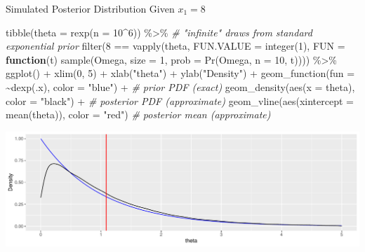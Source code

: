 \documentclass[
  ignorenonframetext,
]{beamer}
\newenvironment{Shaded}{\begin{snugshade}}{\end{snugshade}}
\newcommand{\AttributeTok}[1]{\textcolor[rgb]{0.77,0.63,0.00}{#1}}
\newcommand{\CommentTok}[1]{\textcolor[rgb]{0.56,0.35,0.01}{\textit{#1}}}
\newcommand{\ControlFlowTok}[1]{\textcolor[rgb]{0.13,0.29,0.53}{\textbf{#1}}}
\newcommand{\DecValTok}[1]{\textcolor[rgb]{0.00,0.00,0.81}{#1}}
\newcommand{\FunctionTok}[1]{\textcolor[rgb]{0.00,0.00,0.00}{#1}}
\newcommand{\NormalTok}[1]{#1}
\newcommand{\SpecialCharTok}[1]{\textcolor[rgb]{0.00,0.00,0.00}{#1}}
\newcommand{\StringTok}[1]{\textcolor[rgb]{0.31,0.60,0.02}{#1}}
\begin{document}
\begin{frame}[fragile]{Simulated Posterior Distribution Given
\(x_1 = 8\)}
\protect\hypertarget{simulated-posterior-distribution-given-x_1-8}{}
\begin{Shaded}
\begin{Highlighting}[]
\FunctionTok{tibble}\NormalTok{(}\AttributeTok{theta =} \FunctionTok{rexp}\NormalTok{(}\AttributeTok{n =} \DecValTok{10}\SpecialCharTok{\^{}}\DecValTok{6}\NormalTok{)) }\SpecialCharTok{\%\textgreater{}\%} \CommentTok{\# "infinite" draws from standard exponential prior}
  \FunctionTok{filter}\NormalTok{(}\DecValTok{8} \SpecialCharTok{==} \FunctionTok{vapply}\NormalTok{(theta, }\AttributeTok{FUN.VALUE =} \FunctionTok{integer}\NormalTok{(}\DecValTok{1}\NormalTok{), }\AttributeTok{FUN =} \ControlFlowTok{function}\NormalTok{(t) }
    \FunctionTok{sample}\NormalTok{(Omega, }\AttributeTok{size =} \DecValTok{1}\NormalTok{, }\AttributeTok{prob =} \FunctionTok{Pr}\NormalTok{(Omega, }\AttributeTok{n =} \DecValTok{10}\NormalTok{, t)))) }\SpecialCharTok{\%\textgreater{}\%}
  \FunctionTok{ggplot}\NormalTok{() }\SpecialCharTok{+} \FunctionTok{xlim}\NormalTok{(}\DecValTok{0}\NormalTok{, }\DecValTok{5}\NormalTok{) }\SpecialCharTok{+} \FunctionTok{xlab}\NormalTok{(}\StringTok{"theta"}\NormalTok{) }\SpecialCharTok{+} \FunctionTok{ylab}\NormalTok{(}\StringTok{"Density"}\NormalTok{) }\SpecialCharTok{+} 
  \FunctionTok{geom\_function}\NormalTok{(}\AttributeTok{fun =} \SpecialCharTok{\textasciitilde{}}\FunctionTok{dexp}\NormalTok{(.x), }\AttributeTok{color =} \StringTok{"blue"}\NormalTok{) }\SpecialCharTok{+} \CommentTok{\# prior PDF (exact)}
  \FunctionTok{geom\_density}\NormalTok{(}\FunctionTok{aes}\NormalTok{(}\AttributeTok{x =}\NormalTok{ theta), }\AttributeTok{color =} \StringTok{"black"}\NormalTok{)  }\SpecialCharTok{+} \CommentTok{\# posterior PDF (approximate)}
  \FunctionTok{geom\_vline}\NormalTok{(}\FunctionTok{aes}\NormalTok{(}\AttributeTok{xintercept =} \FunctionTok{mean}\NormalTok{(theta)), }\AttributeTok{color =} \StringTok{"red"}\NormalTok{) }\CommentTok{\# posterior mean (approximate)}
\end{Highlighting}
\end{Shaded}

\includegraphics{Slides04_files/figure-beamer/sim-1.pdf}
\end{frame}
\end{document}
